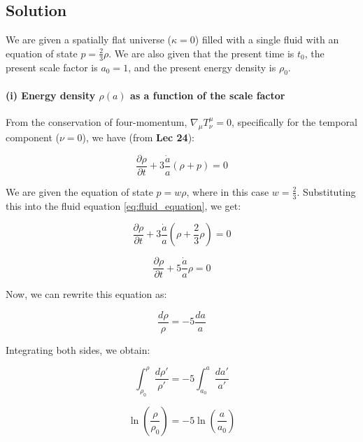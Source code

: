 \documentclass{article}
\begin{document}
\subsection*{Solution}

We are given a spatially flat universe ($\kappa = 0$) filled with a single fluid with an equation of state $p = \frac{2}{3}\rho$. We are also given that the present time is $t_0$, the present scale factor is $a_0 = 1$, and the present energy density is $\rho_0$.

\paragraph{(i) Energy density $\rho(a)$ as a function of the scale factor}

From the conservation of four-momentum, $\nabla_\mu T^\mu_\nu = 0$, specifically for the temporal component ($\nu = 0$), we have (from \textbf{Lec 24}):

\begin{equation} \label{eq:fluid_equation}
\frac{\partial \rho}{\partial t} + 3\frac{\dot{a}}{a}(\rho + p) = 0
\end{equation}

We are given the equation of state $p = w\rho$, where in this case $w = \frac{2}{3}$. Substituting this into the fluid equation \eqref{eq:fluid_equation}, we get:

\begin{equation}
\frac{\partial \rho}{\partial t} + 3\frac{\dot{a}}{a}\left(\rho + \frac{2}{3}\rho\right) = 0
\end{equation}

\begin{equation}
\frac{\partial \rho}{\partial t} + 5\frac{\dot{a}}{a}\rho = 0
\end{equation}

Now, we can rewrite this equation as:

\begin{equation}
\frac{d\rho}{\rho} = -5 \frac{da}{a}
\end{equation}

Integrating both sides, we obtain:

\begin{equation}
\int_{\rho_0}^{\rho} \frac{d\rho'}{\rho'} = -5 \int_{a_0}^{a} \frac{da'}{a'}
\end{equation}

\begin{equation}
\ln\left(\frac{\rho}{\rho_0}\right) = -5 \ln\left(\frac{a}{a_0}\right)
\end{equation}
\end{document}
